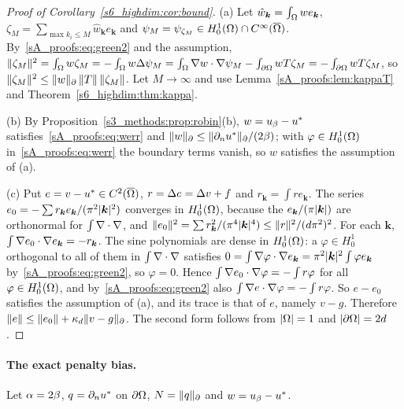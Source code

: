 \begin{proof}[Proof of Corollary~\ref{s6_highdim:cor:bound}]
(a) Let $\hat w_{\boldsymbol k}=\int_\Omega we_{\boldsymbol k}$,
$\zeta_M=\sum_{\max k_i\le M}\hat w_{\boldsymbol k}e_{\boldsymbol k}$ and
$\psi_M=\psi_{\zeta_M}\in H^1_0(\Omega)\cap C^\infty(\overline{\Omega})$. By~\eqref{sA_proofs:eq:green2} and
the assumption,
$\lVert \zeta_M\rVert^2=\int_\Omega w\zeta_M=-\int_\Omega w\Delta\psi_M=\int_\Omega\nabla w\cdot\nabla\psi_M-\int_{\partial\Omega}wT\zeta_M=-\int_{\partial\Omega}wT\zeta_M$,
so $\lVert \zeta_M\rVert^2\le\lVert w\rVert_{\partial}\,\lVert T\rVert\,\lVert \zeta_M\rVert$. Let $M\to\infty$ and use
Lemma~\ref{sA_proofs:lem:kappaT} and Theorem~\ref{s6_highdim:thm:kappa}.

(b) By Proposition~\ref{s3_methods:prop:robin}(b), $w=u_{\beta}-u^{*}$
satisfies~\eqref{sA_proofs:eq:werr} and $\lVert w\rVert_{\partial}\le\lVert \partial_nu^{*}\rVert_{\partial}/(2\beta)$; with $\varphi\in H^1_0(\Omega)$
in~\eqref{sA_proofs:eq:werr} the boundary terms vanish, so $w$ satisfies the assumption of (a).

(c) Put $e=v-u^{*}\in C^2(\overline{\Omega})$, $r=\Delta e=\Delta v+f$ and $r_{\boldsymbol k}=\int re_{\boldsymbol k}$.
The series $e_0=-\sum r_{\boldsymbol k}e_{\boldsymbol k}/(\pi^2\lvert \boldsymbol k\rvert^2)$ converges in
$H^1_0(\Omega)$, because the $e_{\boldsymbol k}/(\pi\lvert \boldsymbol k\rvert)$ are orthonormal for
$\int\nabla\cdot\nabla$, and
$\lVert e_0\rVert^2=\sum r_{\boldsymbol k}^2/(\pi^4\lvert \boldsymbol k\rvert^4)\le\lVert r\rVert^2/(d\pi^2)^2$. For each
$\boldsymbol k$, $\int\nabla e_0\cdot\nabla e_{\boldsymbol k}=-r_{\boldsymbol k}$. The sine polynomials
are dense in $H^1_0(\Omega)$: a $\varphi\in H^1_0$ orthogonal to all of them in $\int\nabla\cdot\nabla$
satisfies $0=\int\nabla\varphi\cdot\nabla e_{\boldsymbol k}=\pi^2\lvert \boldsymbol k\rvert^2\int\varphi
e_{\boldsymbol k}$ by~\eqref{sA_proofs:eq:green2}, so $\varphi=0$. Hence
$\int\nabla e_0\cdot\nabla\varphi=-\int r\varphi$ for all $\varphi\in H^1_0(\Omega)$, and
by~\eqref{sA_proofs:eq:green2} also $\int\nabla e\cdot\nabla\varphi=-\int r\varphi$. So $e-e_0$ satisfies
the assumption of (a), and its trace is that of $e$, namely $v-g$. Therefore
$\lVert e\rVert\le\lVert e_0\rVert+\kappa_d\lVert v-g\rVert_{\partial}$. The second form follows from $\lvert \Omega\rvert=1$ and
$\lvert \partial\Omega\rvert=2d$.
\end{proof}

\paragraph{The exact penalty bias.} Let $\alpha=2\beta$, $q=\partial_nu^{*}$ on $\partial\Omega$, $N=\lVert q\rVert_{\partial}$ and
$w=u_{\beta}-u^{*}$.

